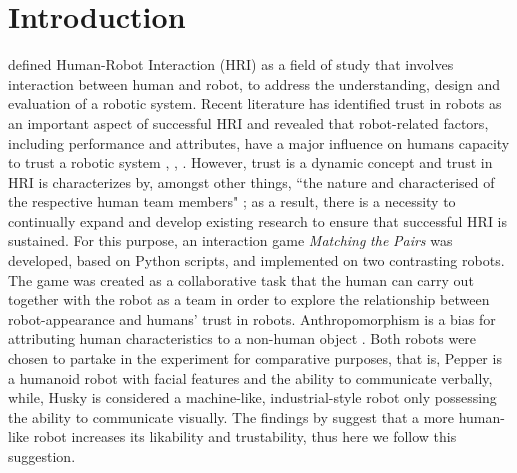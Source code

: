\documentclass[letterpaper]{article} %
\begin{document}
\section{Introduction}
\cite{murphy2010human} defined Human-Robot Interaction (HRI) as a field of study that involves interaction between human and robot, to address the understanding, design and evaluation of a robotic system. Recent literature has identified trust in robots as an important aspect of successful HRI and revealed that robot-related factors, including performance and attributes, have a major influence on humans capacity to trust a robotic system \cite{hancock2011meta}, \cite{billings2012human}, \cite{sanders2011model}. However, trust is a dynamic concept \cite{chang2010seeing} and trust in HRI is characterizes by, amongst other things,  ``the nature and characterised of the respective human team members" \cite{maurtua2017human}; as a result, there is a necessity to continually expand and develop existing research to ensure that successful HRI is sustained. For this purpose, an interaction game \textit{Matching} \textit{the} \textit{Pairs} was developed, based on Python scripts, and implemented on two contrasting robots. The game was created as a collaborative task that the human can carry out together with the robot as a team in order to explore the relationship between robot-appearance and humans' trust in robots. Anthropomorphism is a bias for attributing human characteristics to a non-human object \cite{duffy2003anthropomorphism}. Both robots were chosen to partake in the experiment for comparative purposes, that is, Pepper is a humanoid robot with facial features and the ability to communicate verbally, while, Husky is considered a machine-like, industrial-style robot only possessing the ability to communicate visually. The findings by \cite{li2010cross} suggest that a more human-like robot increases its likability and trustability, thus here we follow this suggestion.
\end{document}

